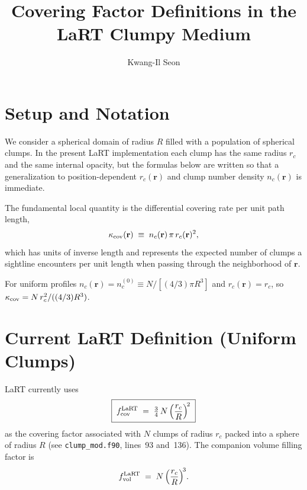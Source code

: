 \documentclass[english,a4paper]{my_memo}
\begin{document}
\title{Covering Factor Definitions in the LaRT Clumpy Medium}
\author{Kwang-Il Seon}
\date{\docmoddate}
\maketitle

\tableofcontents
\bigskip

\section{Setup and Notation}

We consider a spherical domain of radius $R$ filled with a population of
spherical clumps.  In the present LaRT implementation each clump has the
same radius $r_c$ and the same internal opacity, but the formulas below are
written so that a generalization to position-dependent
$r_c(\mathbf{r})$ and clump number density $n_c(\mathbf{r})$ is immediate.

The fundamental local quantity is the differential covering rate per unit
path length,
\begin{equation}
   \kappa_{\rm cov}(\mathbf{r}) \;\equiv\; n_c(\mathbf{r})\,\pi\,r_c(\mathbf{r})^2 ,
   \label{eq:kappa_cov}
\end{equation}
which has units of inverse length and represents the expected number of
clumps a sightline encounters per unit length when passing through the
neighborhood of $\mathbf{r}$.

For uniform profiles
$n_c(\mathbf{r})=n_c^{(0)}\equiv N/[(4/3)\pi R^{3}]$ and
$r_c(\mathbf{r})=r_c$, so
$\kappa_{\rm cov} = N\,r_c^{2}/((4/3)R^{3})$.

\section{Current LaRT Definition (Uniform Clumps)}

LaRT currently uses
\begin{equation}
   \boxed{\;
   f_{\rm cov}^{\rm LaRT} \;=\; \tfrac{3}{4}\,N\,\Bigl(\frac{r_c}{R}\Bigr)^{\!2}\; }
   \label{eq:fcov_LaRT}
\end{equation}
as the covering factor associated with $N$ clumps of radius $r_c$ packed
into a sphere of radius $R$ (see \texttt{clump\_mod.f90}, lines~93 and~136).
The companion volume filling factor is
\begin{equation}
   f_{\rm vol}^{\rm LaRT} \;=\; N\,\Bigl(\frac{r_c}{R}\Bigr)^{\!3}.
   \label{eq:fvol_LaRT}
\end{equation}
\end{document}
